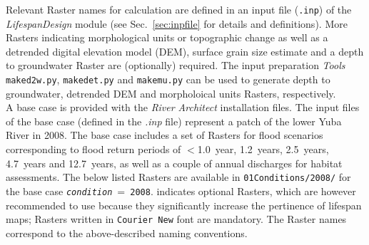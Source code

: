 Relevant Raster names for calculation are defined in an input file (\texttt{.inp}) of the \textit{LifespanDesign} module (see Sec.~\ref{sec:inpfile} for details and definitions). More Rasters indicating morphological units \citep[e.g.][]{wyrick14b} or topographic change \citep[e.g.][]{carley12} as well as a detrended digital elevation model (DEM), surface grain size estimate and a depth to groundwater Raster are (optionally) required. The input preparation \textit{Tools} \texttt{make{\myUnderscore}d2w.py}, \texttt{make{\myUnderscore}det.py} and \texttt{make{\myUnderscore}mu.py} can be used to generate depth to groundwater, detrended DEM and morpholoical units Rasters, respectively.\\
A base case is provided with the \textit{River Architect} installation files. The input files of the base case (defined in the \textit{.inp} file) represent a patch of the lower Yuba River in 2008. The base case includes a set of Rasters for flood scenarios corresponding to flood return periods of $< $1.0~year, 1.2~years, 2.5~years, 4.7~years and 12.7~years, as well as a couple of annual discharges for habitat assessments. The below listed Rasters are available in \texttt{01{\myUnderscore}Conditions/2008/} for the base case \texttt{\textit{condition}}~=~\texttt{2008}.  indicates optional Rasters, which are however recommended to use because they significantly increase the pertinence of lifespan maps; Rasters written in \texttt{Courier New} font are mandatory. The Raster names correspond to the above-described naming conventions.\\

